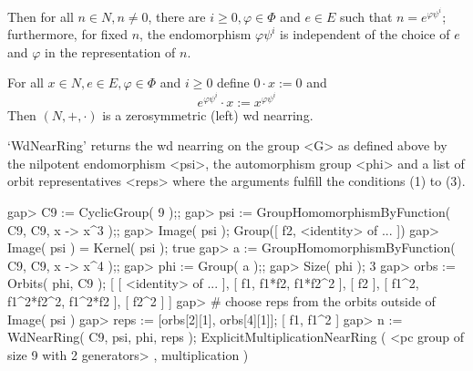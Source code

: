 Then for all $n\in N, n\neq 0$, there are $i\geq 0 ,\varphi\in\Phi$ and
$e\in E$ such that $n = e^{\varphi\psi^i}$; furthermore, for fixed $n$, the
endomorphism $\varphi\psi^i$ is independent of the choice of $e$ and
$\varphi$ in the representation of $n$. 
 
For all $x\in N, e\in E,\varphi\in\Phi$ and $i\geq 0$ define $0\cdot x := 0$
and
    $$ e^{\varphi\psi^i}\cdot x := x^{\varphi\psi^i} $$
Then $(N,+,\cdot)$ is a zerosymmetric (left) wd nearring. 

`WdNearRing' returns the wd nearring on the group <G> as defined above
by the nilpotent endomorphism <psi>, the automorphism group <phi> and
a list of orbit representatives <reps> where the arguments fulfill the
conditions (1) to (3).

\beginexample
    gap> C9 := CyclicGroup( 9 );;
    gap> psi := GroupHomomorphismByFunction( C9, C9, x -> x^3 );;
    gap> Image( psi );  
    Group([ f2, <identity> of ... ])
    gap> Image( psi ) = Kernel( psi );
    true
    gap> a := GroupHomomorphismByFunction( C9, C9, x -> x^4 );;         
    gap> phi := Group( a );;
    gap> Size( phi );
    3
    gap> orbs := Orbits( phi, C9 );
    [ [ <identity> of ... ], [ f1, f1*f2, f1*f2^2 ], [ f2 ], 
      [ f1^2, f1^2*f2^2, f1^2*f2 ], [ f2^2 ] ]
    gap> # choose reps from the orbits outside of Image( psi )
    gap> reps := [orbs[2][1], orbs[4][1]];
    [ f1, f1^2 ]
    gap> n := WdNearRing( C9, psi, phi, reps );
    ExplicitMultiplicationNearRing ( <pc group of size 9 with 
    2 generators> , multiplication )
\endexample



